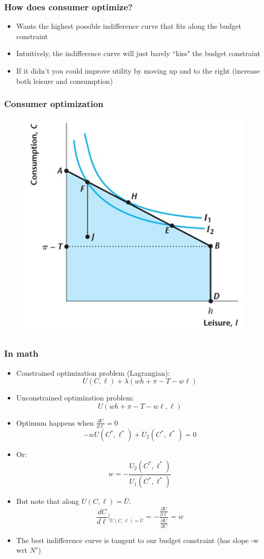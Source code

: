 \documentclass{beamer}
\begin{document}
\begin{frame}
\frametitle[alignment=center]{How does consumer optimize?}
\begin{itemize}
\item Wants the highest possible indifference curve that fits along the budget constraint
\bigskip
\item Intuitively, the indifference curve will just barely ``kiss" the budget constraint
\bigskip
\item If it didn't you could improve utility by moving up and to the right (increase both leisure and consumption)
\end{itemize}
\end{frame}

\begin{frame}
\frametitle[alignment=center]{Consumer optimization}
\begin{figure}
\centering
\includegraphics[scale=0.5]{Figures/W_Fig_4pt5.png}
\end{figure}
\end{frame}

\begin{frame}
\frametitle[alignment=center]{In math}
\begin{itemize}
\item Constrained optimization problem (Lagrangian):
$$U(C,\ell)+\lambda(wh+\pi-T-w\ell)$$
\item Unconstrained optimization problem:
$$U(wh+\pi-T-w\ell,\ell)$$
\item Optimum happens when $\frac{\partial U}{\partial \ell}=0$
$$-wU(C^*,\ell^*)+U_2(C^*,\ell^*)=0$$
\item Or:
$$w=-\frac{U_2(C^*,\ell^*)}{U_1(C^*,\ell^*)}$$
\item But note that along $U(C,\ell)=\bar{U}$:
$$\frac{d C}{d \ell}|_{U(C,\ell)=\bar{U}}=-\frac{\frac{\partial U}{\partial \ell} }{\frac{\partial U}{\partial C}}=w$$
\item The best indifference curve is tangent to our budget constraint (has slope -w wrt $N^s$)
\end{itemize}
\end{frame}
\end{document}
